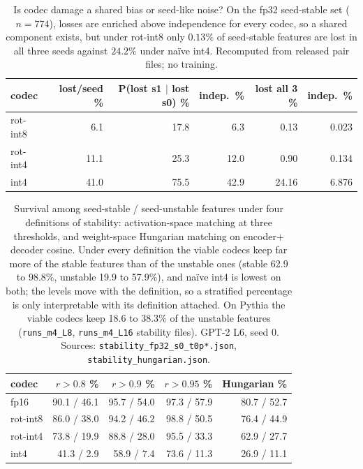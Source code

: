 \begin{table}[htbp]
\caption{Is codec damage a shared bias or seed-like noise? On the fp32 seed-stable set ($n=774$), losses are enriched above independence for every codec, so a shared component exists, but under rot-int8 only $0.13\%$ of seed-stable features are lost in all three seeds against $24.2\%$ under na\"ive int4. Recomputed from released pair files; no training.}
\label{tab:consensus}
\centering\small
\begin{tabular}{lrrrrr}
\toprule
codec & lost/seed \% & P(lost s1 $|$ lost s0) \% & indep.\ \% & lost all 3 \% & indep.\ \% \\
\midrule
rot-int8 & 6.1 & 17.8 & 6.3 & 0.13 & 0.023 \\
rot-int4 & 11.1 & 25.3 & 12.0 & 0.90 & 0.134 \\
int4 & 41.0 & 75.5 & 42.9 & 24.16 & 6.876 \\
\bottomrule
\end{tabular}
\end{table}

\begin{table}[htbp]
\caption{Survival among seed-stable / seed-unstable features under four definitions of stability: activation-space matching at three thresholds, and weight-space Hungarian matching on encoder$+$decoder cosine. Under every definition the viable codecs keep far more of the stable features than of the unstable ones (stable 62.9 to 98.8\%, unstable 19.9 to 57.9\%), and na\"ive int4 is lowest on both; the levels move with the definition, so a stratified percentage is only interpretable with its definition attached. On Pythia the viable codecs keep 18.6 to 38.3\% of the unstable features (\texttt{runs\_m4\_L8}, \texttt{runs\_m4\_L16} stability files). GPT-2 L6, seed 0. Sources: \texttt{stability\_fp32\_s0\_t0p*.json}, \texttt{stability\_hungarian.json}.}
\label{tab:stabdef}
\centering\small
\begin{tabular}{lrrrr}
\toprule
codec & $r>0.8$ \% & $r>0.9$ \% & $r>0.95$ \% & Hungarian \% \\
\midrule
fp16 & 90.1 / 46.1 & 95.7 / 54.0 & 97.3 / 57.9 & 80.7 / 52.7 \\
rot-int8 & 86.0 / 38.0 & 94.2 / 46.2 & 98.8 / 50.5 & 76.4 / 44.9 \\
rot-int4 & 73.8 / 19.9 & 88.8 / 28.0 & 95.5 / 33.3 & 62.9 / 27.7 \\
int4 & 41.3 / 2.9 & 58.9 / 7.4 & 73.6 / 11.3 & 26.9 / 11.1 \\
\bottomrule
\end{tabular}
\end{table}

